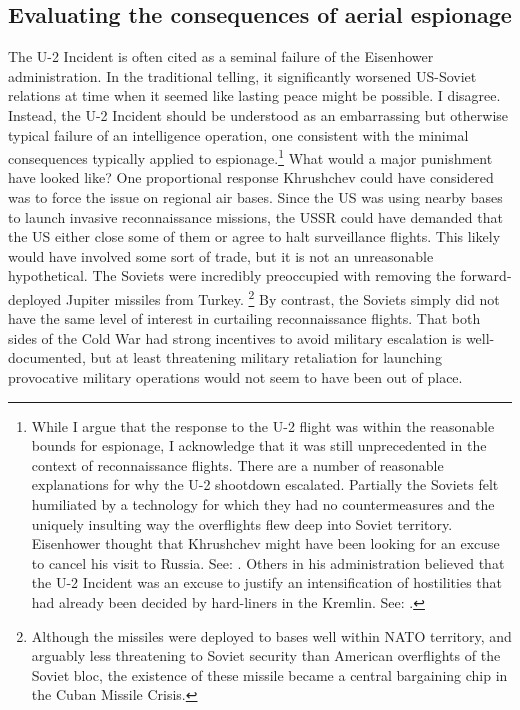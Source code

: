 \documentclass[14pt]{extarticle}
\begin{document}
\subsection{Evaluating the consequences of aerial espionage}
The U-2 Incident is often cited as a seminal failure of the Eisenhower administration. In the traditional telling, it significantly worsened US-Soviet relations at time when it seemed like lasting peace might be possible. I disagree. Instead, the U-2 Incident should be understood as an embarrassing but otherwise typical failure of an intelligence operation, one consistent with the minimal consequences typically applied to espionage.\footnote{While I argue that the response to the U-2 flight was within the reasonable bounds for espionage, I acknowledge that it was still unprecedented in the context of reconnaissance flights. There are a number of reasonable explanations for why the U-2 shootdown escalated. Partially the Soviets felt humiliated by a technology for which they had no countermeasures and the uniquely insulting way the overflights flew deep into Soviet territory. Eisenhower thought that Khrushchev might have been looking for an excuse to cancel his visit to Russia. See: \cite[p.~555]{eisenhower_waging_1965}. Others in his administration believed that the U-2 Incident was an excuse to justify an intensification of hostilities that had already been decided by hard-liners in the Kremlin. See: \cite[p.~328]{kistiakowsky_scientist_1976}.} What would a major punishment have looked like? One proportional response Khrushchev could have considered was to force the issue on regional air bases. Since the US was using nearby bases to launch invasive reconnaissance missions, the USSR could have demanded that the US either close some of them or agree to halt surveillance flights. This likely would have involved some sort of trade, but it is not an unreasonable hypothetical. The Soviets were incredibly preoccupied with removing the forward-deployed Jupiter missiles from Turkey. \footnote{Although the missiles were deployed to bases well within NATO territory, and arguably less threatening to Soviet security than American overflights of the Soviet bloc, the existence of these missile became a central bargaining chip in the Cuban Missile Crisis.} By contrast, the Soviets simply did not have the same level of interest in curtailing reconnaissance flights. That both sides of the Cold War had strong incentives to avoid military escalation is well-documented, but at least threatening military retaliation for launching provocative military operations would not seem to have been out of place.
\end{document}
